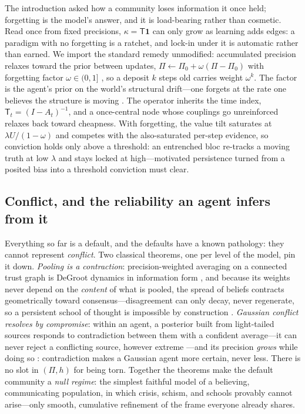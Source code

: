 \documentclass[runningheads]{llncs}
\newcommand{\Top}{\mathsf{T}}          %
\newcommand{\bone}{\mathbf{1}}         %
\begin{document}
The introduction asked how a community loses information it once held; forgetting is the model's
answer, and it is load-bearing rather than cosmetic. Read once from fixed precisions,
$\kappa=\Top\bone$ can only grow as learning adds edges: a paradigm
with no forgetting is a ratchet, and lock-in under it is automatic rather than earned. We import the
standard remedy unmodified: accumulated precision relaxes toward the prior between updates,
$\Pi\leftarrow\Pi_0+\omega(\Pi-\Pi_0)$ with forgetting factor $\omega\in(0,1]$
\citep{friston2017process,smith2022tutorial}, so a deposit $k$ steps old carries weight $\omega^k$.
The factor is the agent's prior on the world's structural drift---one forgets at the rate one believes
the structure is moving \citep{mathys2011}. The operator inherits the time index,
$\Top_t=(I-A_t)^{-1}$, and a once-central node whose couplings go unreinforced relaxes back toward
cheapness. With forgetting, the value tilt saturates at $\lambda U/(1-\omega)$ and competes with the
also-saturated per-step evidence, so conviction holds only above a threshold: an entrenched bloc
re-tracks a moving truth at low $\lambda$ and stays locked at high---motivated persistence turned
from a posited bias into a threshold conviction must clear.

\subsection{Conflict, and the reliability an agent infers from it}
\label{sec:reliability}

Everything so far is a default, and the defaults have a known pathology: they cannot represent
\emph{conflict}. Two classical theorems, one per level of the model, pin it down. \emph{Pooling
is a contraction}: precision-weighted averaging on a connected trust graph is DeGroot dynamics in
information form \citep{degroot1974}, and because its weights never depend on the \emph{content}
of what is pooled, the spread of beliefs contracts geometrically toward consensus---disagreement
can only decay, never regenerate, so a persistent school of thought is impossible by construction
\citep{catal2024}. \emph{Gaussian conflict resolves by compromise}: within an agent, a posterior
built from light-tailed sources responds to contradiction between them with a confident
average---it can never reject a conflicting source, however extreme
\citep{dawid1973,ohagan1979}---and its precision \emph{grows} while doing so \citep{ohagan2012}:
contradiction makes a Gaussian agent more certain, never less. There is no slot in $(\Pi,h)$ for
being torn. Together the theorems make the default community a \emph{null regime}: the simplest
faithful model of a believing, communicating population, in which crisis, schism, and schools
provably cannot arise---only smooth, cumulative refinement of the frame everyone already shares.
\end{document}
